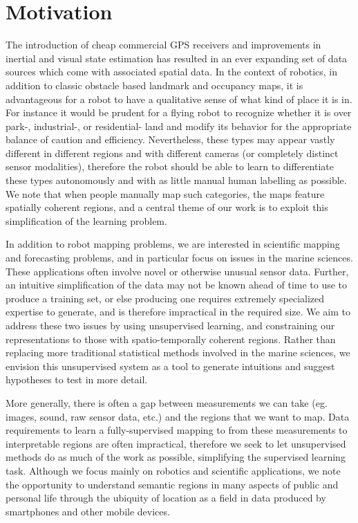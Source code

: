 \section{Motivation}
The introduction of cheap commercial GPS receivers and improvements in inertial and visual state estimation has resulted in an ever expanding set of data sources which come with associated spatial data. In the context of robotics, in addition to classic obstacle based landmark and occupancy maps, it is advantageous for a robot to have a qualitative sense of what kind of place it is in. For instance it would be prudent for a flying robot to recognize whether it is over park-, industrial-, or residential- land and modify its behavior for the appropriate balance of caution and efficiency. Nevertheless, these types may appear vastly different in different regions and with different cameras (or completely distinct sensor modalities), therefore the robot should be able to learn to differentiate these types autonomously and with as little manual human labelling as possible. We note that when people manually map such categories, the maps feature spatially coherent regions, and a central theme of our work is to exploit this simplification of the learning problem.

In addition to robot mapping problems, we are interested in scientific mapping and forecasting problems, and in particular focus on issues in the marine sciences. These applications often involve novel or otherwise unusual sensor data. Further, an intuitive simplification of the data may not be known ahead of time to use to produce a training set, or else producing one requires extremely specialized expertise to generate, and is therefore impractical in the required size. We aim to address these two issues by using unsupervised learning, and constraining our representations to those with spatio-temporally coherent regions. Rather than replacing more traditional statistical methods involved in the marine sciences, we envision this unsupervised system as a tool to generate intuitions and suggest hypotheses to test in more detail.

More generally, there is often a gap between measurements we can take (eg. images, sound, raw sensor data, etc.) and the regions that we want to map. Data requirements to learn a fully-supervised mapping to from these measurements to interpretable regions are often impractical, therefore we seek to let unsupervised methods do as much of the work as possible, simplifying the supervised learning task. Although we focus mainly on robotics and scientific applications, we note the opportunity to understand semantic regions in many aspects of public and personal life through the ubiquity of location as a field in data produced by smartphones and other mobile devices.

